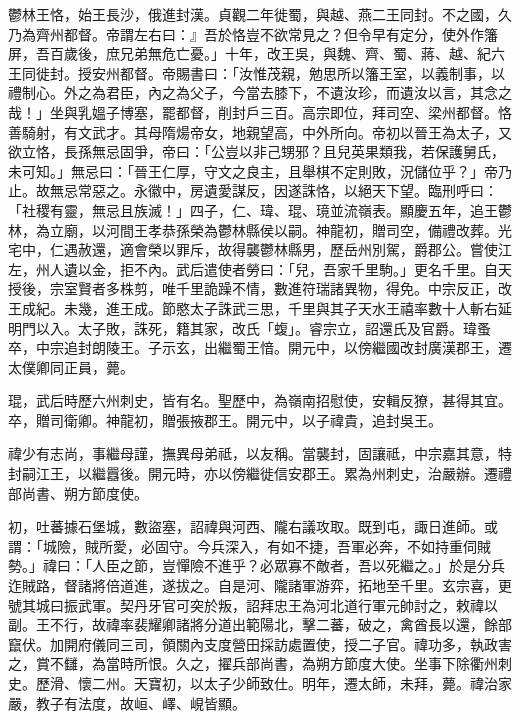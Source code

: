 \begin{pinyinscope}
 鬱林王恪，始王長沙，俄進封漢。貞觀二年徙蜀，與越、燕二王同封。不之國，久乃為齊州都督。帝謂左右曰：』吾於恪豈不欲常見之？但令早有定分，使外作籓屏，吾百歲後，庶兄弟無危亡憂。」十年，改王吳，與魏、齊、蜀、蔣、越、紀六王同徙封。授安州都督。帝賜書曰：「汝惟茂親，勉思所以籓王室，以義制事，以禮制心。外之為君臣，內之為父子，今當去膝下，不遺汝珍，而遺汝以言，其念之哉！」坐與乳媼子博塞，罷都督，削封戶三百。高宗即位，拜司空、梁州都督。恪善騎射，有文武才。其母隋煬帝女，地親望高，中外所向。帝初以晉王為太子，又欲立恪，長孫無忌固爭，帝曰：「公豈以非己甥邪？且兒英果類我，若保護舅氏，未可知。」無忌曰：「晉王仁厚，守文之良主，且舉棋不定則敗，況儲位乎？」帝乃止。故無忌常惡之。永徽中，房遺愛謀反，因遂誅恪，以絕天下望。臨刑呼曰：「社稷有靈，無忌且族滅！」四子，仁、瑋、琨、璄並流嶺表。顯慶五年，追王鬱林，為立廟，以河間王孝恭孫榮為鬱林縣侯以嗣。神龍初，贈司空，備禮改葬。光宅中，仁遇赦還，適會榮以罪斥，故得襲鬱林縣男，歷岳州別駕，爵郡公。嘗使江左，州人遺以金，拒不內。武后遣使者勞曰：「兒，吾家千里駒。」更名千里。自天授後，宗室賢者多株剪，唯千里詭躁不情，數進符瑞諸異物，得免。中宗反正，改王成紀。未幾，進王成。節愍太子誅武三思，千里與其子天水王禧率數十人斬右延明門以入。太子敗，誅死，籍其家，改氏「蝮」。睿宗立，詔還氏及官爵。瑋蚤卒，中宗追封朗陵王。子示玄，出繼蜀王愔。開元中，以傍繼國改封廣漢郡王，遷太僕卿同正員，薨。



 琨，武后時歷六州刺史，皆有名。聖歷中，為嶺南招慰使，安輯反獠，甚得其宜。卒，贈司衛卿。神龍初，贈張掖郡王。開元中，以子禕貴，追封吳王。



 禕少有志尚，事繼母謹，撫異母弟祗，以友稱。當襲封，固讓祗，中宗嘉其意，特封嗣江王，以繼囂後。開元時，亦以傍繼徙信安郡王。累為州刺史，治嚴辦。遷禮部尚書、朔方節度使。



 初，吐蕃據石堡城，數盜塞，詔禕與河西、隴右議攻取。既到屯，諏日進師。或謂：「城險，賊所愛，必固守。今兵深入，有如不捷，吾軍必奔，不如持重伺賊勢。」禕曰：「人臣之節，豈憚險不進乎？必眾寡不敵者，吾以死繼之。」於是分兵迮賊路，督諸將倍道進，遂拔之。自是河、隴諸軍游弈，拓地至千里。玄宗喜，更號其城曰振武軍。契丹牙官可突於叛，詔拜忠王為河北道行軍元帥討之，敕禕以副。王不行，故禕率裴耀卿諸將分道出範陽北，擊二蕃，破之，禽酋長以還，餘部竄伏。加開府儀同三司，領關內支度營田採訪處置使，授二子官。禕功多，執政害之，賞不讎，為當時所恨。久之，擢兵部尚書，為朔方節度大使。坐事下除衢州刺史。歷滑、懷二州。天寶初，以太子少師致仕。明年，遷太師，未拜，薨。禕治家嚴，教子有法度，故峘、嶧、峴皆顯。




\end{pinyinscope}
